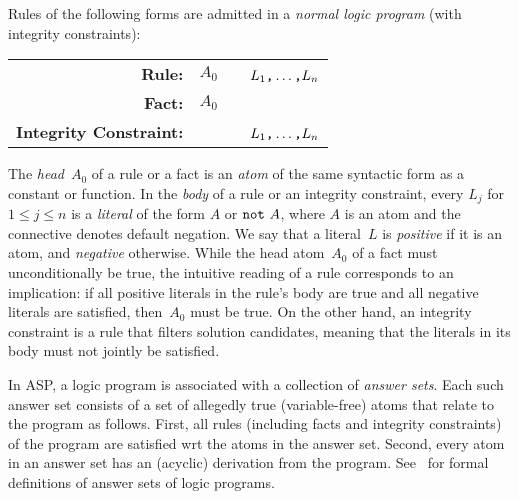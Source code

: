 Rules of the following forms are admitted in a
\emph{normal logic program} (with integrity constraints):
\par
\medskip
\begin{tabular}{rl@{}l}\label{eq:normal:rule}
\textbf{Rule:} & $A_0$&~\code{:-}~$L_1\text{\texttt{,}}\dots\text{\texttt{,}}L_n$\code{.}
\\
\textbf{Fact:} & $A_0$&\code{.}
\\
\textbf{Integrity Constraint:} & &~\code{:-}~$L_1\texttt{,}\dots\texttt{,}L_n$\code{.}
\end{tabular}
%
%
%
\par
\medskip
\noindent
The \emph{head}~$A_0$ of a rule or a fact is an \emph{atom} of the same
syntactic form as a constant or function.
%
In the \emph{body} of a rule or an integrity constraint,
every $L_j$ for $1\leq j\leq n$ is a \emph{literal} of the form $A$ or $\texttt{not}~A$,
where $A$ is an atom and
the connective  denotes default negation.
%
%
We say that a literal~$L$ is \emph{positive} if it is an atom,
and \emph{negative} otherwise.
While the head atom~$A_0$ of a fact must unconditionally be true,
the intuitive reading of a rule corresponds to an implication:
if all positive literals in the rule's body are true and all negative
literals are satisfied, then~$A_0$ must be true.
On the other hand, an integrity constraint is a rule that filters solution candidates,
meaning that the literals in its body must not jointly be satisfied.

In ASP, a logic program is associated with a collection of \emph{answer sets}.
Each such answer set consists of a set of allegedly true (variable-free) atoms that relate to the program as follows.
First, all rules (including facts and integrity constraints) of the program are satisfied wrt the atoms in the answer set.
Second, every atom in an answer set has an (acyclic) derivation from the program.
%
See~\cite{gellif88b,gelfond08a,lifschitz08a} for formal definitions of answer sets of logic programs.

